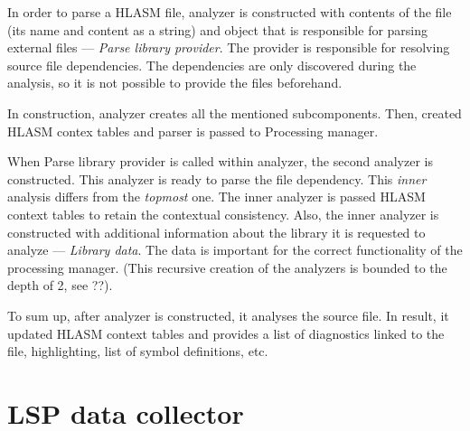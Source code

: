 In order to parse a HLASM file, analyzer is constructed with contents of the file (its name and content as a string) and object that is responsible for parsing external files --- \emph{Parse library provider}. The provider is responsible for resolving source file dependencies. The dependencies are only discovered during the analysis, so it is not possible to provide the files beforehand.

In construction, analyzer creates all the mentioned subcomponents. Then, created HLASM contex tables and parser is passed to Processing manager.

When Parse library provider is called within analyzer, the second analyzer is constructed. This analyzer is ready to parse the file dependency. This \emph{inner} analysis differs from the \emph{topmost} one. The inner analyzer is passed HLASM context tables to retain the contextual consistency. Also, the inner analyzer is constructed with additional information about the library it is requested to analyze --- \emph{Library data}. The data is important for the correct functionality of the processing manager. (This recursive creation of the analyzers is bounded to the depth of 2, see ??).

To sum up, after analyzer is constructed, it analyses the source file. In result, it updated HLASM context tables and provides a list of diagnostics linked to the file, highlighting, list of symbol definitions, etc.

\section{LSP data collector}




